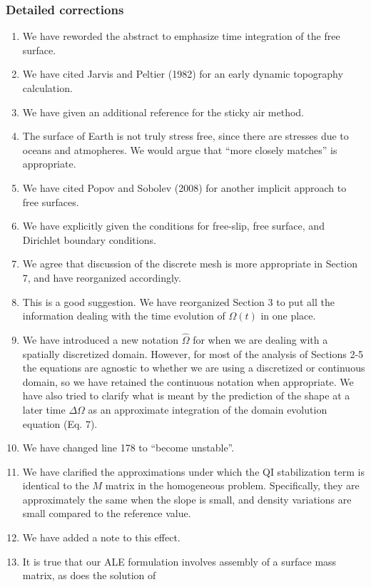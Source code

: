 \documentclass[a4paper,12pt]{article}
\begin{document}
\subsubsection*{Detailed corrections}
\begin{enumerate}
  \item We have reworded the abstract to emphasize time integration of the free surface.
  \item We have cited Jarvis and Peltier (1982) for an early dynamic topography calculation.
  \item We have given an additional reference for the sticky air method.
  \item The surface of Earth is not truly stress free, since there are stresses due to oceans and atmopheres.
    We would argue that ``more closely matches'' is appropriate.
  \item We have cited Popov and Sobolev (2008) for another implicit approach to free surfaces.
  \item We have explicitly given the conditions for free-slip, free surface, and Dirichlet boundary conditions.
  \item We agree that discussion of the discrete mesh is more appropriate in Section 7, and have reorganized accordingly.
  \item This is a good suggestion. We have reorganized Section 3 to put all the information dealing with
    the time evolution of $\Omega(t)$ in one place.
  \item We have introduced a new notation $\hat{\Omega}$ for when we are dealing with a spatially discretized domain.
However, for most of the analysis of Sections 2-5 the equations are agnostic to whether we are using a discretized
or continuous domain, so we have retained the continuous notation when appropriate. We have also tried to clarify
what is meant by the prediction of the shape at a later time $\Delta \Omega$ as an approximate integration of the
domain evolution equation (Eq. 7).
  \item We have changed line 178 to ``become unstable''.
  \item We have clarified the approximations under which the QI stabilization term is identical to
the $M$ matrix in the homogeneous problem. Specifically, they are approximately the same when the slope is small,
and density variations are small compared to the reference value.
  \item We have added a note to this effect.
  \item It is true that our ALE formulation involves assembly of a surface mass matrix, as does the solution of

\end{enumerate}
\end{document}
